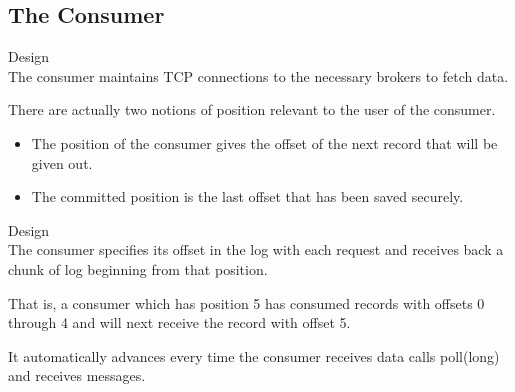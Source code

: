 \subsection{The Consumer}
\begin{frame}[plain,t]{Design} %
     \\
    \vspace{2ex}
    The consumer maintains TCP connections to the necessary brokers to fetch data.
    
    \vspace{2ex}
    
    
    There are actually two notions of position relevant to the user of the consumer.
    \begin{itemize}
        \item The position of the consumer gives the offset of the next record that will be given out. 
        \item The committed position is the last offset that has been saved securely. 
    \end{itemize}
     \vspace{2ex}
    
    
    
\end{frame}
\begin{frame}[plain,t]{Design} %
     \\
    \vspace{2ex}
The consumer specifies its offset in the log with each request and receives back a chunk of log beginning from that position. 

\vspace{2ex}
That is, a consumer which has position 5 has consumed records with offsets 0 through 4 and will next receive the record with offset 5. 


\vspace{2ex}
It automatically advances every time the consumer receives data calls poll(long) and receives messages.



\end{frame}
